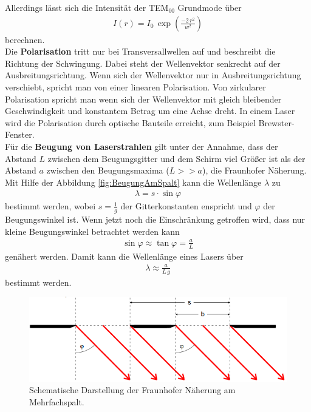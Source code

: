 Allerdings lässt sich die Intensität der TEM$_{00}$ Grundmode über
\begin{align}
	I(r) = I_0\,\exp \left(\frac{-2\,r^2}{w^2} \right)
\end{align}
berechnen. \\
Die \textbf{Polarisation} tritt nur bei Transversallwellen auf und beschreibt die Richtung der Schwingung. Dabei steht der Wellenvektor senkrecht auf der Ausbreitungsrichtung. Wenn sich der Wellenvektor nur in Ausbreitungsrichtung verschiebt, spricht man von einer linearen Polarisation. Von zirkularer Polarisation spricht man wenn sich der Wellenvektor mit gleich bleibender Geschwindigkeit und konstantem Betrag um eine Achse dreht. In einem Laser wird die Polarisation durch optische Bauteile erreicht, zum Beispiel Brewster-Fenster. \\
Für die \textbf{Beugung von Laserstrahlen} gilt unter der Annahme, dass der Abstand $L$ zwischen dem Beugungsgitter und dem Schirm viel Größer ist als der Abstand $a$ zwischen den Beugungsmaxima ($L >> a$), die Fraunhofer Näherung. Mit Hilfe der Abbildung \eqref{fig:BeugungAmSpalt} kann die Wellenlänge $\lambda$ zu
\begin{align}
	\lambda = s\cdot\sin\varphi
\end{align}
bestimmt werden, wobei $s = \frac{1}{g}$ der Gitterkonstanten enspricht und $\varphi$ der Beugungswinkel ist. Wenn jetzt noch die Einschränkung getroffen wird, dass nur kleine Beugungswinkel betrachtet werden kann
\begin{align}
	\sin\varphi \approx \tan\varphi = \frac{a}{L}
\end{align}
genähert werden. Damit kann die Wellenlänge eines Lasers über
\begin{align}
	\lambda \approx \frac{a}{L\,g}
\end{align}
bestimmt werden.

\begin{figure}[H]
	\includegraphics{BeugungAmSpalt.PNG}
	\caption{Schematische Darstellung der Fraunhofer Näherung am Mehrfachspalt. \cite{V406}}
	\label{fig:BeugungAmSpalt}
\end{figure}



